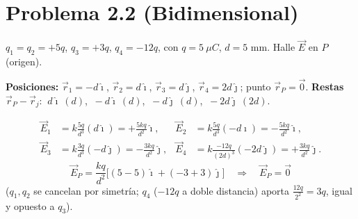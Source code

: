 \documentclass[12pt,letterpaper]{article}
\begin{document}
\clearpage
\section*{\textcolor{ubbblue}{Problema 2.2 (Bidimensional)}}
$q_1=q_2=+5q$, $q_3=+3q$, $q_4=-12q$, con $q=5\ \mu C$, $d=5$ mm. Halle $\vec E$ en $P$ (origen).

\medskip
\noindent
\begin{minipage}[t]{0.34\textwidth}
\centering\vspace{0pt}
\end{minipage}%
\hfill
\begin{minipage}[t]{0.62\textwidth}
\vspace{0pt}
\textbf{Posiciones:} $\vec r_1=-d\hat\imath$, $\vec r_2=d\hat\imath$, $\vec r_3=d\hat\jmath$,
$\vec r_4=2d\hat\jmath$; punto $\vec r_P=\vec 0$.
\smallskip
\textbf{Restas} $\vec r_P-\vec r_j$: $\ d\hat\imath\ (d)$, $\ -d\hat\imath\ (d)$, $\ -d\hat\jmath\ (d)$,
$\ -2d\hat\jmath\ (2d)$.
\end{minipage}

\begin{align*}
    \vec E_1 &= k\frac{5q}{d^{3}}(d\hat\imath)=+\frac{5kq}{d^{2}}\hat\imath, &
    \vec E_2 &= k\frac{5q}{d^{3}}(-d\hat\imath)=-\frac{5kq}{d^{2}}\hat\imath,\\
    \vec E_3 &= k\frac{3q}{d^{3}}(-d\hat\jmath)=-\frac{3kq}{d^{2}}\hat\jmath, &
    \vec E_4 &= k\frac{-12q}{(2d)^{3}}(-2d\hat\jmath)=+\frac{3kq}{d^{2}}\hat\jmath.
\end{align*}
\[
    \vec E_P = \frac{kq}{d^{2}}\big[(5-5)\hat\imath + (-3+3)\hat\jmath\big]
    \quad\Longrightarrow\quad \boxed{\vec E_P = \vec 0}
\]
($q_1,q_2$ se cancelan por simetr\'ia; $q_4$ ($-12q$ a doble distancia) aporta
$\tfrac{12q}{2^2}=3q$, igual y opuesto a $q_3$).
\end{document}

